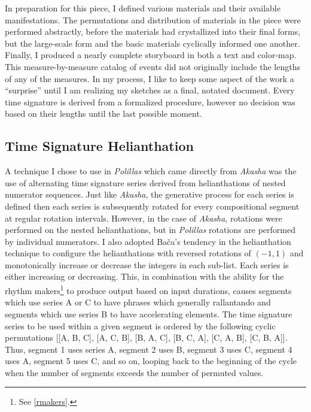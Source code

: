 In preparation for this piece, I defined various materials and their available manifestations. The permutations and distribution of materials in the piece were performed abstractly, before the materials had crystallized into their final forms, but the large-scale form and the basic materials cyclically informed one another. Finally, I produced a nearly complete storyboard in both a text and color-map. This measure-by-measure catalog of events did not originally include the lengths of any of the measures. In my process, I like to keep some aspect of the work a ``surprise'' until I am realizing my sketches as a final, notated document. Every time signature is derived from a formalized procedure, however no decision was based on their lengths until the last possible moment.

\subsection{Time Signature Helianthation}

A technique I chose to use in \textit{Polillas} which came directly from \textit{Akasha} was the use of alternating time signature series derived from helianthations of nested numerator sequences. Just like \textit{Akasha}, the generative process for each series is defined then each series is subsequently rotated for every compositional segment at regular rotation intervals. However, in the case of \textit{Akasha}, rotations were performed on the nested helianthations, but in \textit{Polillas} rotations are performed by individual numerators. I also adopted Bača's tendency in the helianthation technique to configure the helianthations with reversed rotations of $(-1, 1)$ and monotonically increase or decrease the integers in each sub-list. Each series is either increasing or decreasing. This, in combination with the ability for the rhythm makers\footnote{See \vref{rmakers}.} to produce output based on input durations, causes segments which use series A or C to have phrases which generally rallantando and segments which use series B to have accelerating elements. The time signature series to be used within a given segment is ordered by the following cyclic permutations [[A, B, C], [A, C, B], [B, A, C], [B, C, A], [C, A, B], [C, B, A]]. Thus, segment 1 uses series A, segment 2 uses B, segment 3 uses C, segment 4 uses A, segment 5 uses C, and so on, looping back to the beginning of the cycle when the number of segments exceeds the number of permuted values.

